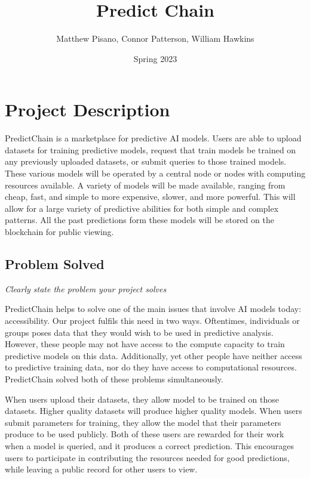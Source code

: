 \documentclass{article}
\title{Predict Chain}
\author{Matthew Pisano, Connor Patterson, William Hawkins}
\date{Spring 2023}
\begin{document}
    \maketitle

    \section{Project Description}

    PredictChain is a marketplace for predictive AI models. Users are able to upload datasets for training predictive models,
    request that train models be trained on any previously uploaded datasets, or submit queries to those trained models.
    These various models will be operated by a central node or nodes with computing resources available. A variety of
    models will be made available, ranging from cheap, fast, and simple to more expensive, slower, and more powerful.
    This will allow for a large variety of predictive abilities for both simple and complex patterns.  All the past
    predictions form these models will be stored on the blockchain for public viewing.

    \subsection{Problem Solved}
    \emph{Clearly state the problem your project solves}

    PredictChain helps to solve one of the main issues that involve AI models today: accessibility.  Our project fulfils this
    need in two ways.  Oftentimes, individuals or groups poses data that they would wish to be used in predictive analysis.
    However, these people may not have access to the compute capacity to train predictive models on this data.  Additionally,
    yet other people have neither access to predictive training data, nor do they have access to computational resources.
    PredictChain solved both of these problems simultaneously.

    When users upload their datasets, they allow model to be trained on those datasets.  Higher quality datasets will produce
    higher quality models.  When users submit parameters for training, they allow the model that their parameters produce to
    be used publicly.  Both of these users are rewarded for their work when a model is queried, and it produces a correct
    prediction.  This encourages users to participate in contributing the resources needed for good predictions, while
    leaving a public record for other users to view.
\end{document}
